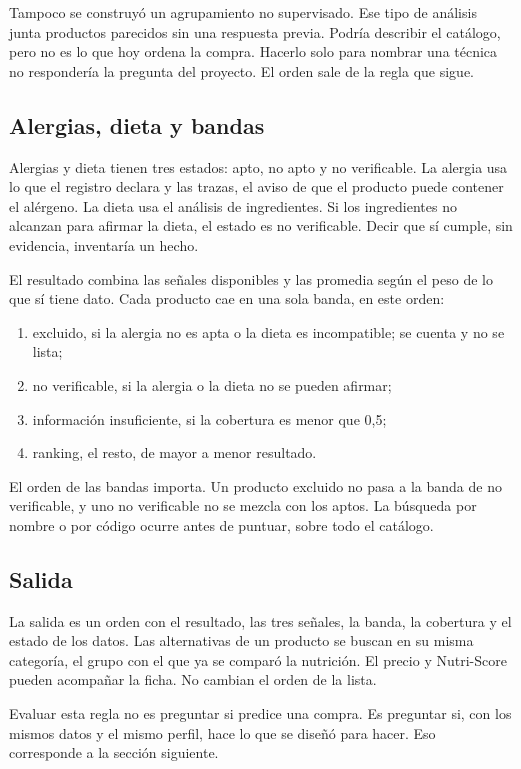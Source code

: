 Tampoco se construyó un agrupamiento no supervisado. Ese tipo de análisis junta productos parecidos sin una respuesta previa. Podría describir el catálogo, pero no es lo que hoy ordena la compra. Hacerlo solo para nombrar una técnica no respondería la pregunta del proyecto. El orden sale de la regla que sigue.

\subsection{Alergias, dieta y bandas}

Alergias y dieta tienen tres estados: apto, no apto y no verificable. La alergia usa lo que el registro declara y las trazas, el aviso de que el producto puede contener el alérgeno. La dieta usa el análisis de ingredientes. Si los ingredientes no alcanzan para afirmar la dieta, el estado es no verificable. Decir que sí cumple, sin evidencia, inventaría un hecho.

El resultado combina las señales disponibles y las promedia según el peso de lo que sí tiene dato. Cada producto cae en una sola banda, en este orden:

\begin{enumerate}
  \item excluido, si la alergia no es apta o la dieta es incompatible; se cuenta y no se lista;
  \item no verificable, si la alergia o la dieta no se pueden afirmar;
  \item información insuficiente, si la cobertura es menor que 0{,}5;
  \item ranking, el resto, de mayor a menor resultado.
\end{enumerate}

El orden de las bandas importa. Un producto excluido no pasa a la banda de no verificable, y uno no verificable no se mezcla con los aptos. La búsqueda por nombre o por código ocurre antes de puntuar, sobre todo el catálogo.

\subsection{Salida}

La salida es un orden con el resultado, las tres señales, la banda, la cobertura y el estado de los datos. Las alternativas de un producto se buscan en su misma categoría, el grupo con el que ya se comparó la nutrición. El precio y Nutri-Score pueden acompañar la ficha. No cambian el orden de la lista.

Evaluar esta regla no es preguntar si predice una compra. Es preguntar si, con los mismos datos y el mismo perfil, hace lo que se diseñó para hacer. Eso corresponde a la sección siguiente.
